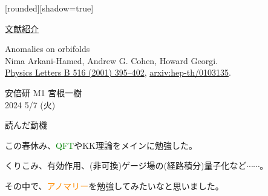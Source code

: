 \documentclass[
  unicode,a4paper,10pt,
  xcolor = {dvipsnames,svgnames},
  hyperref ={colorlinks=true,citecolor=Navy,linkcolor=NavyBlue,urlcolor=purple},
  ja=standard,lualatex
]{beamer}
\begin{document}
\nocite{Arkani-Hamed:2001uol}

\begin{frame}

  [rounded][shadow=true]

  \begin{center}
    \uline{文献紹介}
  \end{center}
  \begin{block}{}
    \vspace*{5pt}

    \centering\Large
    Anomalies on orbifolds
    \\
    \normalsize
    Nima Arkani-Hamed, Andrew G. Cohen, Howard Georgi.
    \\
    \small
    \href{https://doi.org/10.1016/S0370-2693(01)00946-7}{Physics Letters B 516 (2001) 395–402},
    \href{https://doi.org/10.48550/arXiv.hep-th/0103135}{arxiv:hep-th/0103135}.

    \vspace*{5pt}
  \end{block}

  \begin{center}
    安倍研 M1 宮根一樹\\
    2024 5/7 (火)
  \end{center}
\end{frame}


\begin{frame}{読んだ動機}

  この春休み、\textcolor{Green}{QFT}やKK理論をメインに勉強した。

  \vspace*{5pt}
  
  くりこみ、有効作用、(非可換)ゲージ場の(経路積分)量子化など$\cdots\cdots$。

  \vspace*{5pt}
  
  その中で、\textcolor{DarkOrange}{アノマリー}を勉強してみたいなと思いました。

\end{frame}
\end{document}
